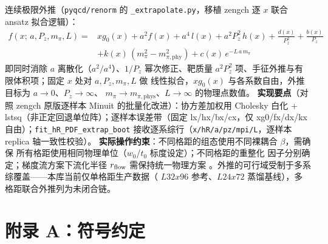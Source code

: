 \documentclass[11pt,a4paper]{ctexart}
\newcommand{\code}[1]{\texttt{#1}}
\begin{document}
连续极限外推（\code{pyqcd/renorm} 的 \code{\_extrapolate.py}，移植
zengch 逐 $x$ 联合 ansatz 拟合逻辑）：
\begin{equation}\label{eq:extrap-ansatz}
\begin{aligned}
f(x;\,a,P_z,m_\pi,L) ={}& xg_0(x) + a^2 f(x) + a^4\,l(x)
+ a^2P_z^2\,h(x) + \frac{d(x)}{P_z^2} + \frac{b(x)}{P_z}\\
& + k(x)\,(m_\pi^2-m_{\pi,\mathrm{phy}}^2)
+ c(x)\,e^{-L\,a\,m_\pi}
\end{aligned}
\end{equation}
即同时消除 $a$ 离散化（$a^2/a^4$）、$1/P_z$ 幂次修正、靶质量
$a^2P_z^2$ 项、手征外推与有限体积项；固定 $x$ 处对 $a,P_z,m_\pi,L$ 做
线性拟合，$xg_0(x)$ 与各系数自由，外推目标为 $a\to0$、$P_z\to\infty$、
$m_\pi\to m_{\pi,\mathrm{phys}}$、$L\to\infty$ 的物理点数值。\textbf{
实现要点}（对照 zengch 原版逐样本 Minuit 的批量化改进）：协方差加权用
Cholesky 白化 + lstsq（非正定回退单位阵）；逐样本误差带（固定
lx/hx/bx/cx，仅 xg0/fx/dx/kx 自由）；\code{fit\_hR\_PDF\_extrap\_boot}
接收逐系综行（\code{x/hR/a/pz/mpi/L}，逐样本 replica 轴一致性校验）。
\textbf{实际操作约束}：不同格距的组态使用不同裸耦合 $\beta$，需确保
所有格距使用相同物理单位（$w_0$/$t_0$ 标度设定）；不同格距的重整化
因子分别确定；梯度流方案下流化半径 $r_{\rm flow}$ 需保持统一物理方案
。外推的可行域受制于多系综覆盖——本库当前仅单格距生产数据（
$L32x96$ 参考、$L24x72$ 蒸馏基线），多格距联合外推列为未闭合链。

\appendix
\section{附录 A：符号约定}
\end{document}
